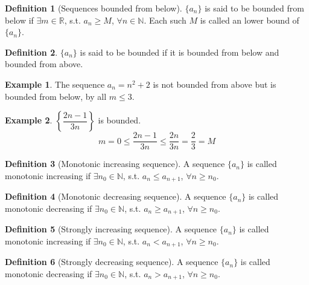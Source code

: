 \documentclass[fleqn, a4paper, 12pt, twoside]{article}
\theoremstyle{definition}
\newtheorem{example}{Example}
\newtheorem{definition}{Definition}
\theoremstyle{theorem}
\begin{document}
{\begin{definition}[Sequences bounded from below]
	$\{a_n\}$ is said to be bounded from below if $\exists m \in \mathbb{R}$, s.t. $a_n \geq M$, $\forall n \in \mathbb{N}$.
	Each such $M$ is called an lower bound of $\{a_n\}$.
\end{definition}

\begin{definition}
	$\{a_n\}$ is said to be bounded if it is bounded from below and bounded from above.
\end{definition}

\begin{example}
	The sequence $a_n = n^2 + 2$ is not bounded from above but is bounded from below, by all $m \leq 3$.
\end{example}

\begin{example}
	$\left\{ \dfrac{2n - 1}{3n} \right\}$ is bounded.
	\begin{equation*}
		m = 0 \leq \dfrac{2n - 1}{3n} \leq \dfrac{2n}{3n} = \dfrac{2}{3} = M
	\end{equation*}
\end{example}

\begin{definition}[Monotonic increasing sequence]
	A sequence $\{a_n\}$ is called monotonic increasing if $\exists n_0 \in \mathbb{N}$, s.t. $a_n \leq a_{n + 1}$, $\forall n \geq n_0$.
\end{definition}

\begin{definition}[Monotonic decreasing sequence]
	A sequence $\{a_n\}$ is called monotonic decreasing if $\exists n_0 \in \mathbb{N}$, s.t. $a_n \geq a_{n + 1}$, $\forall n \geq n_0$.
\end{definition}

\begin{definition}[Strongly increasing sequence]
	A sequence $\{a_n\}$ is called monotonic increasing if $\exists n_0 \in \mathbb{N}$, s.t. $a_n < a_{n + 1}$, $\forall n \geq n_0$.
\end{definition}

\begin{definition}[Strongly decreasing sequence]
	A sequence $\{a_n\}$ is called monotonic decreasing if $\exists n_0 \in \mathbb{N}$, s.t. $a_n > a_{n + 1}$, $\forall n \geq n_0$.
\end{definition}

}
\end{document}
